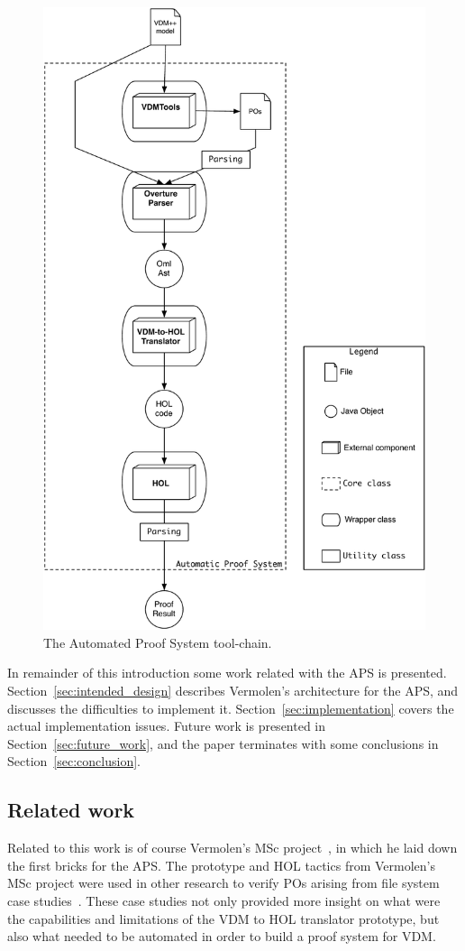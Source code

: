 \documentclass[]{article}
\begin{document}
\begin{figure}
  \begin{center}
    \includegraphics[width=.6\textwidth]{images/tool_chain.pdf}
    \caption[APS tool-chain]{The Automated Proof System tool-chain.}
    \label{fig:aps_contrib}
  \end{center}
\end{figure}


In remainder of this introduction some work related with the APS is presented.
Section~\ref{sec:intended_design} describes Vermolen's architecture for the APS, and discusses the difficulties to implement it.
Section~\ref{sec:implementation} covers the actual implementation issues.
Future work is presented in Section~\ref{sec:future_work}, and the paper terminates with some conclusions in Section~\ref{sec:conclusion}.

\subsection{Related work}
\label{sub:related_work}

Related to this work is of course Vermolen's MSc project~\cite{Vermolen07}, in which he laid down the first bricks for the APS.
The prototype and HOL tactics from Vermolen's MSc project were used in other research to verify POs arising from file system case studies~\cite{FerreiraSO2008,Ferreira2009,FerreiraSBMF09}.
These case studies not only provided more insight on what were the capabilities and limitations of the VDM to HOL translator prototype, but also what needed to be automated in order to build a proof system for VDM.
\end{document}
